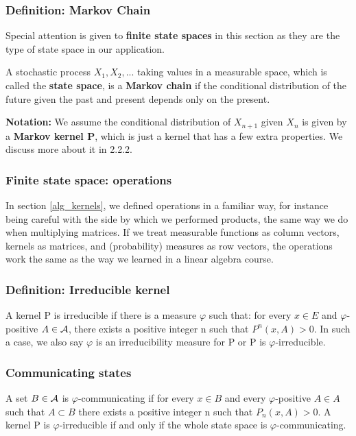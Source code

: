 \subsubsection{Definition: Markov Chain}

Special attention is given to \textbf{finite state spaces} in this section as they are the type of state space in our application.

A stochastic process $X_1, X_2, ...$ taking values in a measurable space, which is called the \textbf{state space}, is a \textbf{Markov chain} if the conditional distribution of the future given the past and present depends only on the present.

\textbf{Notation:} We assume the conditional distribution of $X_{n+1}$ given $X_n$ is given by a \textbf{Markov kernel P}, which is just a kernel that has a few extra properties. We discuss more about it in 2.2.2.

\subsubsection{Finite state space: operations}
In section \ref{alg_kernels}, we defined operations in a familiar way, for instance being careful with the side by which we performed products, the same way we do when multiplying matrices. If we treat measurable functions as column vectors, kernels as matrices, and (probability) measures as row vectors, the operations work the same as the way we learned in a linear algebra course.

\subsubsection{Definition: Irreducible kernel}
A kernel P is irreducible if there is a measure $\varphi$ such that: for every $x \in E$ and $\varphi$-positive $A \in \mathcal{A}$, there exists a positive integer n such that $P^n(x,A) > 0$. In such a case, we also say $\varphi$ is an irreducibility measure for P or P is $\varphi$-irreducible.

\subsubsection{Communicating states}
A set $B \in \mathcal{A}$ is $\varphi$-communicating if for every $x \in B$ and every $\varphi$-positive $A \in A$ such that $A \subset B$ there exists a positive integer n such that $P_n(x,A) > 0$. A kernel P is $\varphi$-irreducible if and only if the whole state space is $\varphi$-communicating.


